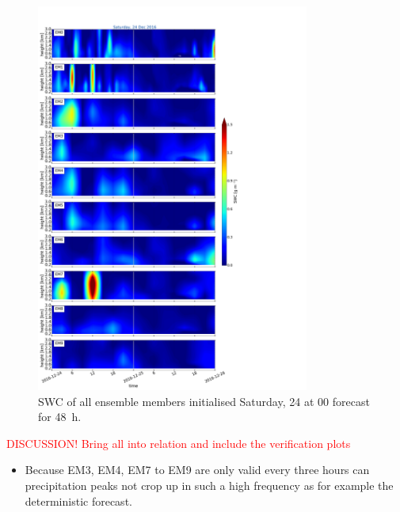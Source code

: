%
\begin{figure}[t]
	\centering
	\includegraphics[trim={0cm 0cm 18.3cm 5.1cm},clip,width=0.8\textwidth]{./fig_09EM/20161224}
	\caption{SWC of all ensemble members initialised Saturday, \SI{24}{\dec} at 0\SI{0}{\UTC} forecast for \SI{48}{\hour}.}\label{fig:EM09_24}
\end{figure}
\textcolor{red}{DISCUSSION! Bring all into relation and include the verification plots}
\begin{itemize}
	\item Because EM3, EM4, EM7 to EM9 are only valid every three hours can precipitation peaks not crop up in such a high frequency as for example the deterministic forecast. 
\end{itemize}


